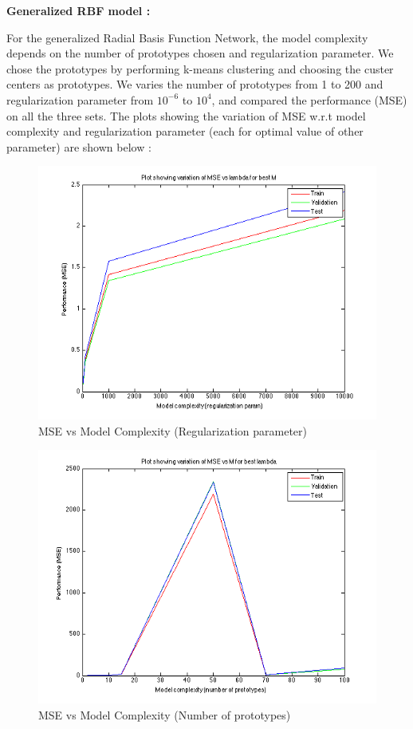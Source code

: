 \documentclass{article}
\begin{document}
\textbf{Generalized RBF model :}

For the generalized Radial Basis Function Network, the model complexity depends on the number of prototypes chosen and regularization parameter. We chose the prototypes by performing k-means clustering and choosing the custer centers as prototypes. We varies the number of prototypes from 1 to 200 and regularization parameter from $10^{-6}$ to $10^4$, and compared the performance (MSE) on all the three sets. The plots showing the variation of MSE w.r.t model complexity and regularization parameter (each for optimal value of other parameter) are shown below :

\begin{figure}[H]
\centering
\includegraphics[width=0.8\linewidth]{Regression/rbfnn_univariate/mse_lambda.png}
\caption{MSE vs Model Complexity (Regularization parameter)}
\end{figure}

\begin{figure}[H]
\centering
\includegraphics[width=0.8\linewidth]{Regression/rbfnn_univariate/mse_m.png}
\caption{MSE vs Model Complexity (Number of prototypes)}
\end{figure}
\end{document}
